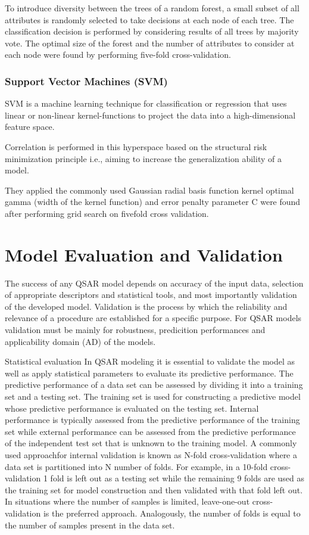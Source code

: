To introduce diversity between the trees of a random forest, a small subset of all attributes is randomly selected to take decisions at each node of each tree. The classification decision is performed by considering results of all trees by majority vote. The optimal size of the forest and the number of attributes to consider at each node were found by performing five-fold cross-validation. \cite{Lapins2013}

\subsubsection{Support Vector Machines (SVM)}
SVM is a machine learning technique for classification or regression that uses linear or non-linear kernel-functions to project the data into a high-dimensional feature space. \cite{Lapins2013}

Correlation is performed in this hyperspace based on the structural risk minimization principle i.e., aiming to increase the generalization ability of a model. \cite{Lapins2013}

They applied the commonly used Gaussian radial basis function kernel optimal gamma (width of the kernel function) and error penalty parameter C were found after performing grid search on five­fold cross validation. \cite{Lapins2013}


\section{Model Evaluation and Validation}

The success of any QSAR model depends on accuracy of the input data, selection of appropriate descriptors and statistical tools, and most importantly validation of the developed model. Validation is the process by which the reliability and relevance of a procedure are established for a specific purpose. For QSAR models validation must be mainly for robustness, predicition performances and applicability domain (AD) of the models. \cite{Lapins2013}

Statistical evaluation In QSAR modeling it is essential to validate the model as well as apply statistical parameters to evaluate its predictive performance. The predictive performance of a data set can be assessed by dividing it into a training set and a testing set. The training set is used for constructing a predictive model whose predictive performance is evaluated on the testing set. Internal performance is typically assessed from the predictive performance of the training set while external performance can be assessed from the predictive performance of the independent test set that is unknown to the training model. A commonly used approachfor internal validation is known as N-fold cross-validation where a data set is partitioned into N number of folds. For example, in a 10-fold cross-validation 1 fold is left out as a testing set while the remaining 9 folds are used as the training set for model construction and then validated with that fold left out. In situations where the number of samples is limited, leave-one-out cross-validation is the preferred approach. Analogously, the number of folds is equal to the number of samples present in the data set. \cite{Nantasenamat2009}

